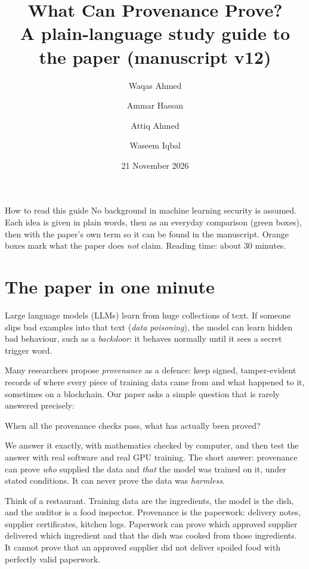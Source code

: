 
\title{\sffamily\bfseries What Can Provenance Prove?\\[3pt]
\large\mdseries A plain-language study guide to the paper (manuscript v12)}
\author{Waqas Ahmed \and Ammar Hassan \and Attiq Ahmed \and Waseem Iqbal}
\date{21 November 2026}

\sloppy
\maketitle

\begin{keypoint}{How to read this guide}
No background in machine learning security is assumed. Each idea is given in plain words,
then as an everyday comparison (green boxes), then with the paper's own term so it can be
found in the manuscript. Orange boxes mark what the paper does \emph{not} claim. Reading time:
about 30 minutes.
\end{keypoint}

\tableofcontents
\newpage

\section{The paper in one minute}
Large language models (LLMs) learn from huge collections of text. If someone slips bad
examples into that text (\emph{data poisoning}), the model can learn hidden bad behaviour,
such as a \emph{backdoor}: it behaves normally until it sees a secret trigger word.

Many researchers propose \emph{provenance} as a defence: keep signed, tamper-evident records
of where every piece of training data came from and what happened to it, sometimes on a
blockchain. Our paper asks a simple question that is rarely answered precisely:

\begin{center}\sffamily\large
When all the provenance checks pass, what has actually been proved?
\end{center}

We answer it exactly, with mathematics checked by computer, and then test the answer with
real software and real GPU training. The short answer: provenance can prove \emph{who}
supplied the data and \emph{that} the model was trained on it, under stated conditions. It can
never prove the data was \emph{harmless}.

\begin{analogy}
Think of a restaurant. Training data are the ingredients, the model is the dish, and the
auditor is a food inspector. Provenance is the paperwork: delivery notes, supplier
certificates, kitchen logs. Paperwork can prove which approved supplier delivered which
ingredient and that the dish was cooked from those ingredients. It cannot prove that an
approved supplier did not deliver spoiled food with perfectly valid paperwork.
\end{analogy}

